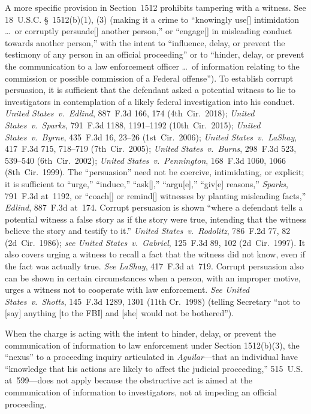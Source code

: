 A more specific provision in Section~1512 prohibits tampering with a witness.
See 18~U.S.C. \S~1512(b)(1), (3) (making it a crime to ``knowingly use[] intimidation \dots\ or corruptly persuade[] another person,'' or ``engage[] in misleading conduct towards another person,'' with the intent to ``influence, delay, or prevent the testimony of any person in an official proceeding'' or to ``hinder, delay, or prevent the communication to a law enforcement officer \dots\ of information relating to the commission or possible commission of a Federal offense'').
To establish corrupt persuasion, it is sufficient that the defendant asked a potential witness to lie to investigators in contemplation of a likely federal investigation into his conduct.
\textit{United States~v.\ Edlind}, 887~F.3d 166, 174 (4th~Cir.~2018);
\textit{United States~v.\ Sparks}, 791~F.3d 1188, 1191--1192 (10th~Cir.~2015);
\textit{United States~v.\ Byrne}, 435~F.3d 16, 23--26 (1st~Cir.~2006);
\textit{United States~v.\ LaShay}, 417~F.3d 715, 718--719 (7th~Cir.~2005);
\textit{United States~v.\ Burns}, 298~F.3d 523, 539--540 (6th~Cir.~2002);
\textit{United States~v.\ Pennington}, 168~F.3d 1060, 1066 (8th~Cir.~1999).
The ``persuasion'' need not be coercive, intimidating, or explicit;
it is sufficient to ``urge,'' ``induce,'' ``ask[],'' ``argu[e],'' ``giv[e] reasons,''
\textit{Sparks}, 791~F.3d at~1192, or ``coach[] or remind[] witnesses by planting misleading facts,''
\textit{Edlind}, 887~F.3d at~174.
Corrupt persuasion is shown ``where a defendant tells a potential witness a false story as if the story were true, intending that the witness believe the story and testify to it.''
\textit{United States~v.\ Rodolitz}, 786~F.2d 77, 82 (2d~Cir.~1986);
\textit{see United States~v.\ Gabriel}, 125~F.3d 89, 102 (2d~Cir.~1997).
It also covers urging a witness to recall a fact that the witness did not know, even if the fact was actually true.
\textit{See LaShay}, 417~F.3d at~719.
Corrupt persuasion also can be shown in certain circumstances when a person, with an improper motive, urges a witness not to cooperate with law enforcement.
\textit{See United States~v.\ Shotts}, 145~F.3d 1289, 1301 (11th Cr.~1998) (telling Secretary ``not to [say] anything [to the FBI] and [she] would not be bothered'').

When the charge is acting with the intent to hinder, delay, or prevent the communication of information to law enforcement under Section 1512(b)(3), the ``nexus'' to a proceeding inquiry articulated in \textit{Aguilar}---that an individual have ``knowledge that his actions are likely to affect the judicial proceeding,'' 515~U.S. at~599---does not apply because the obstructive act is aimed at the communication of information to investigators, not at impeding an official proceeding.


